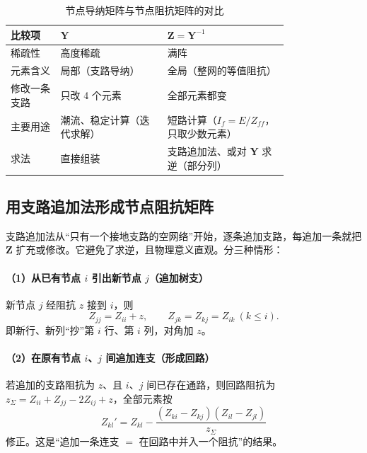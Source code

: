 \begin{table}[htbp]
  \centering
  \caption{节点导纳矩阵与节点阻抗矩阵的对比}
  \small
  \begin{tabular}{@{}p{0.14\linewidth}p{0.30\linewidth}p{0.34\linewidth}@{}}
    \toprule
    比较项 & $\boldsymbol Y$ & $\boldsymbol Z=\boldsymbol Y^{-1}$ \\
    \midrule
    稀疏性 & 高度稀疏 & 满阵 \\
    元素含义 & 局部（支路导纳） & 全局（整网的等值阻抗） \\
    修改一条支路 & 只改 4 个元素 & 全部元素都变 \\
    主要用途 & 潮流、稳定计算（迭代求解） & 短路计算（$I_f=E/Z_{ff}$，只取少数元素） \\
    求法 & 直接组装 & 支路追加法、或对 $\boldsymbol Y$ 求逆（部分列） \\
    \bottomrule
  \end{tabular}
\end{table}

\subsection{用支路追加法形成节点阻抗矩阵}

支路追加法从“只有一个接地支路的空网络”开始，逐条追加支路，每追加一条就把 $\boldsymbol Z$
扩充或修改。它避免了求逆，且物理意义直观。分三种情形：

\paragraph{（1）从已有节点 $i$ 引出新节点 $j$（追加树支）}
新节点 $j$ 经阻抗 $z$ 接到 $i$，则
\begin{equation}
  Z_{jj}=Z_{ii}+z,\qquad Z_{jk}=Z_{kj}=Z_{ik}\ (k\le i).
\end{equation}
即新行、新列“抄”第 $i$ 行、第 $i$ 列，对角加 $z$。

\paragraph{（2）在原有节点 $i$、$j$ 间追加连支（形成回路）}
若追加的支路阻抗为 $z$、且 $i$、$j$ 间已存在通路，则回路阻抗为
$z_{\Sigma}=Z_{ii}+Z_{jj}-2Z_{ij}+z$，全部元素按
\begin{equation}
  Z_{kl}'=Z_{kl}-\frac{\left(Z_{ki}-Z_{kj}\right)\left(Z_{il}-Z_{jl}\right)}{z_{\Sigma}}
\end{equation}
修正。这是“追加一条连支 $=$ 在回路中并入一个阻抗”的结果。


